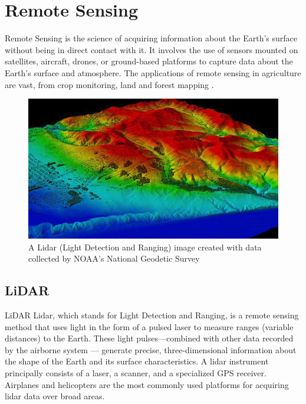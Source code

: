 \documentclass[conference]{IEEEtran}
\begin{document}
\section{Remote Sensing}
Remote Sensing is the science of acquiring information about the Earth's surface without being in direct contact with it. It involves the use of sensors mounted on satellites, aircraft, drones, or ground-based platforms to capture data about the Earth's surface and atmosphere. The applications of remote sensing in agriculture are vast, from crop monitoring, land and forest mapping \cite{forestMapping}.

\begin{figure}
    \centering
    \includegraphics[width=\linewidth]{images/remote-sensing.png}
    \caption{A Lidar (Light Detection and Ranging) image created with data collected by NOAA's National Geodetic Survey}
    \label{fig:remote-sensing}
\end{figure}

\subsection{LiDAR}
LiDAR Lidar, which stands for Light Detection and Ranging, is a remote sensing method that uses light in the form of a pulsed laser to measure ranges (variable distances) to the Earth. These light pulses—combined with other data recorded by the airborne system — generate precise, three-dimensional information about the shape of the Earth and its surface characteristics. 
A lidar instrument principally consists of a laser, a scanner, and a specialized GPS receiver. Airplanes and helicopters are the most commonly used platforms for acquiring lidar data over broad areas. \cite{collis1970lidar}
\end{document}
